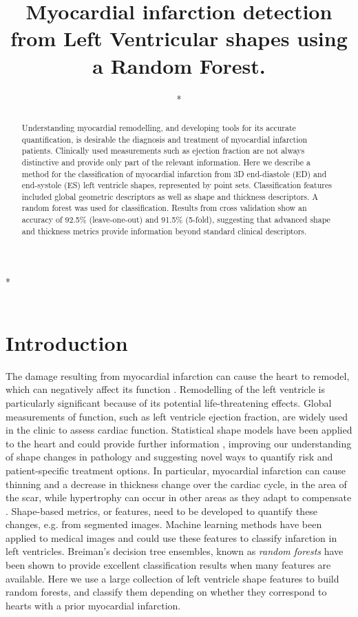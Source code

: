 \documentclass{llncs}
\begin{document}
\title{Myocardial infarction detection from Left Ventricular shapes using a Random Forest.}

\author{*}

\institute
{*\\
\email{*}\\
}
\maketitle              %
\begin{abstract}
Understanding myocardial remodelling, and developing tools for its accurate quantification, is desirable the diagnosis and treatment of myocardial infarction patients. Clinically used measurements such as ejection fraction are not always distinctive and provide only part of the relevant information.  Here we describe a method for the classification of myocardial infarction from 3D end-diastole (ED) and end-systole (ES) left ventricle shapes, represented by point sets. Classification features included global geometric descriptors as well as shape and thickness descriptors. A random forest was used for classification. Results from cross validation show an accuracy of 92.5\% (leave-one-out) and 91.5\% (5-fold), suggesting that advanced shape and thickness metrics provide information beyond standard clinical descriptors.
\end{abstract}
%
\section{Introduction}
The damage resulting from myocardial infarction can cause the heart to remodel, which can negatively affect its function \cite{Sutton2000}. Remodelling of the left ventricle is particularly significant because of its potential life-threatening effects. 
Global measurements of function, such as left ventricle ejection fraction, are widely used in the clinic to assess cardiac function. Statistical shape models \cite{Cootes1992} have been applied to the heart and could provide further information \cite{Lewandowski2012,Young2009,Lorenz2006}, improving our understanding of shape changes in pathology and suggesting novel ways to quantify risk and patient-specific treatment options. In particular, myocardial infarction can cause thinning and a decrease in thickness change over the cardiac cycle, in the area of the scar, while hypertrophy can occur in other areas as they adapt to compensate \cite{Sutton2000}. Shape-based metrics, or features, need to be developed to quantify these changes, e.g. from segmented images. Machine learning methods have been applied to medical images \cite{Mantilla2013,Wernick2010} and could use these features to classify infarction in left ventricles. Breiman's decision tree ensembles, known as \emph{random forests} \cite{Breiman2001} have been shown to provide excellent classification results when many features are available. Here we use a large collection of left ventricle shape features to build random forests, and classify them depending on whether they correspond to hearts with a prior myocardial infarction.
\end{document}
